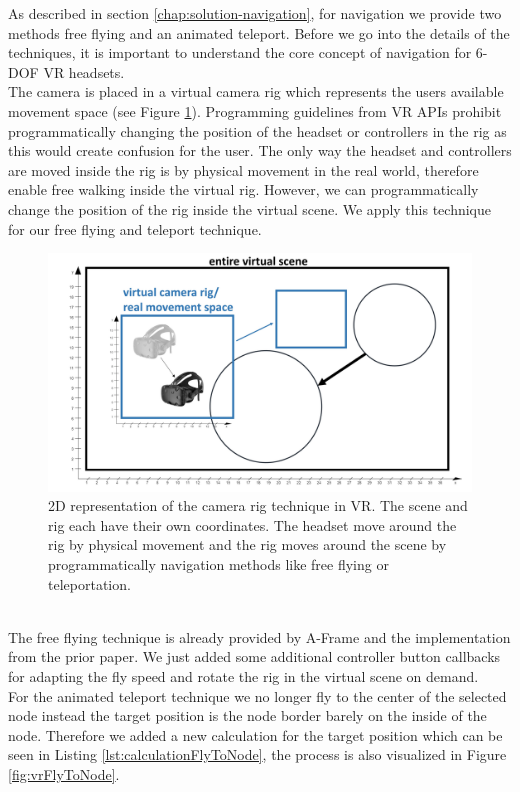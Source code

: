 As described in section \ref{chap:solution-navigation}, for navigation we provide two methods free flying and an animated teleport.
Before we go into the details of the techniques, it is important to understand the core concept of navigation for 6-DOF VR headsets.\\
The camera is placed in a virtual camera rig which represents the users available movement space (see Figure \ref{fig:vrCameraRig}). 
Programming guidelines from VR APIs prohibit programmatically changing the position of the headset or controllers in the rig as this would create confusion for the user. 
The only way the headset and controllers are moved inside the rig is by physical movement in the real world, therefore enable free walking inside the virtual rig.
However, we can programmatically change the position of the rig inside the virtual scene. 
We apply this technique for our free flying and teleport technique.
\begin{figure}[h]
    \centering
    \includegraphics[width=1\textwidth]{graphics/vrCameraRig.jpg}
    \caption{2D representation of the camera rig technique in VR. The scene and rig each have their own coordinates. The headset move around the rig by physical movement and the rig moves around the scene by programmatically navigation methods like free flying or teleportation.} 
    \label{fig:vrCameraRig} 
\end{figure}
\\
The free flying technique is already provided by A-Frame and the implementation from the prior paper.
We just added some additional controller button callbacks for adapting the fly speed and rotate the rig in the virtual scene on demand.\\
For the animated teleport technique we no longer fly to the center of the selected node instead the target position is the node border barely on the inside of the node. Therefore we added a new calculation for the target position which can be seen in Listing \ref{lst:calculationFlyToNode}, the process is also visualized in Figure \ref{fig:vrFlyToNode}.

